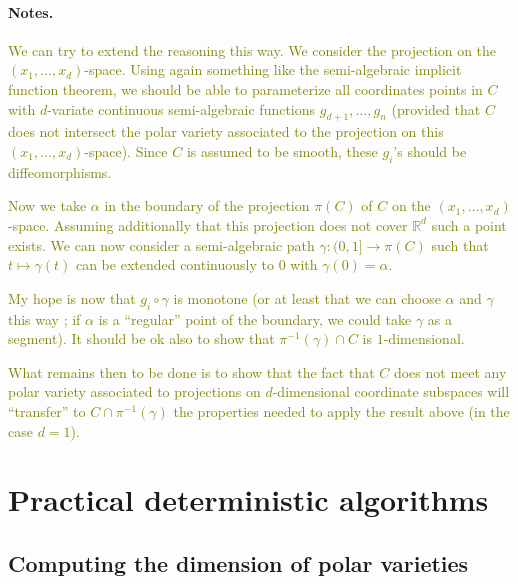 \documentclass[10pt]{article}
\theoremstyle{definition}
\newcommand{\R}{\mathbb{R}}
\def\ms#1{\textcolor{olive}{#1}}
\begin{document}
\paragraph*{Notes.}
\ms{We can try to extend the reasoning this way. We consider the projection on
the $(x_1, \ldots, x_d)$-space. Using again something like the semi-algebraic implicit function theorem, we should be able to parameterize all coordinates points in $C$ with $d$-variate continuous semi-algebraic functions $g_{d+1}, \ldots, g_n$ (provided that $C$ does not intersect the polar variety associated to the projection on this $(x_1, \ldots, x_d)$-space). Since $C$ is
  assumed to be smooth, these $g_i$'s should be diffeomorphisms.}

\ms{Now we take $\alpha$ in the boundary of the projection $\pi(C)$ of $C$ on
  the $(x_1, \ldots, x_d)$-space. Assuming additionally that this projection
  does not cover $\R^d$ such a point exists. We can now consider a
  semi-algebraic path $\gamma:(0, 1]\to \pi(C)$ such that $t\mapsto \gamma(t)$
  can be extended continuously to $0$ with $\gamma(0)=\alpha$. }

\ms{My hope is now that $g_i\circ \gamma$ is monotone (or at least that we can
  choose $\alpha$ and $\gamma$ this way ; if $\alpha$ is a ``regular'' point of
  the boundary, we could take $\gamma$ as a segment). It should be ok also to
  show that $\pi^{-1}(\gamma)\cap C$ is $1$-dimensional. }

\ms{What remains then to be done is to show that the fact that $C$ does not meet
any polar variety associated to projections on $d$-dimensional coordinate
subspaces will ``transfer'' to $C\cap \pi^{-1}(\gamma)$ the properties needed to
apply the result above (in the case $d = 1$).}
%













\section{Practical deterministic algorithms}



\subsection{Computing the dimension of polar varieties}
\end{document}
